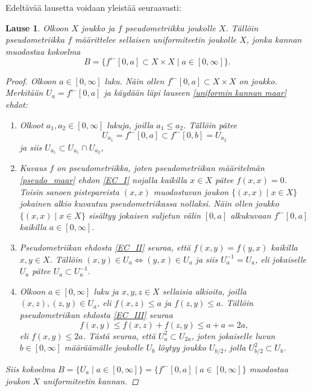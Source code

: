 \documentclass[12pt,a4paper,leqno]{report}
\theoremstyle{plain}
\newtheorem{lause}[equation]{Lause}
\theoremstyle{definition}
\theoremstyle{remark}
\begin{document}
\noindent Edeltävää lausetta voidaan yleistää seuraavasti: 
\begin{lause}\label{pseudo_uniformi_maar}
Olkoon $X$ joukko ja $f$ pseudometriikka joukolle $X$. Tällöin pseudometriikka $f$ määrittelee sellaisen uniformiteetin joukolle $X$, jonka kannan muodostaa kokoelma $$B=\{ f^{\leftarrow}[0,a]\subset X\times X\mid a\in[0,\infty]\}.$$
\begin{proof}
Olkoon $a\in[0,\infty]$ luku. 
Näin ollen $f^{\leftarrow}[0,a]\subset X\times X$ on joukko. 
Merkitään $U_a=f^{\leftarrow}[0,a]$ ja 
käydään läpi lauseen \ref{uniformin kannan maar} ehdot:
\begin{enumerate} [label=(B\arabic*)]
\item %
Olkoot $a_1,a_2\in[0,\infty]$ lukuja, joilla $a_1\leq a_2$. 
Tällöin pätee $$U_{a_1}=f^{\leftarrow}[0,a]\subset f^{\leftarrow}[0,b]=U_{a_2}$$ ja siis $U_{a_1}\subset U_{a_1}\cap U_{a_2}$,
\item%
Kuvaus $f$ on pseudometriikka, joten pseudometriikan määritelmän \ref{pseudo_maar} ehdon \ref{EC_I} nojalla kaikilla $x\in X$ pätee $f(x,x)=0$. 
Toisin sanoen pistepareista $(x,x)$ muodostuvan joukon $\{(x,x)\mid x\in X\}$ jokainen alkio kuvautuu pseudometriikassa nollaksi. Näin ollen joukko $\{(x,x)\mid x\in X\}$ sisältyy jokaisen suljetun välin $[0,a]$ alkukuvaan $f^{\leftarrow}[0,a]$ kaikilla $a\in [0,\infty]$.
\item%
Pseudometriikan ehdosta \ref{EC_II} seuraa, että $f(x,y)=f(y,x)$ kaikilla $x,y\in X$. 
Tällöin $(x,y)\in U_a\Leftrightarrow (y,x)\in U_a$ ja siis $U_a^{-1}=U_a$, eli jokaiselle $U_a$ pätee $U_a\subset U_a^{-1}. $
\item%
Olkoon $a\in[0,\infty]$ luku ja $x,y,z\in X$ sellaisia alkioita, 
joilla $(x,z),(z,y)\in U_a$, 
eli $f(x,z)\leq a$ ja $f(z,y)\leq a$.
Tällöin pseudometriikan ehdosta \ref{EC_III} seuraa 
$$f(x,y)\leq f(x,z)+f(z,y)\leq a+a=2a,$$ 
eli $f(x,y)\leq 2a$. Tästä seuraa, että $U_a^2\subset U_{2a} $, joten jokaiselle luvun $b\in[0,\infty]$ määräämälle joukolle $U_b$ löytyy joukko $U_{b/2}$, jolla $U_{b/2}^2\subset U_b$.
\end{enumerate}
Siis kokoelma $B=\{U_a\mid a\in[0,\infty]\}
=\{f^{\leftarrow}[0,a]\mid a\in[0,\infty]\}
$ muodostaa joukon $X$ uniformiteetin kannan.
\end{proof}
\end{lause}
\end{document}
